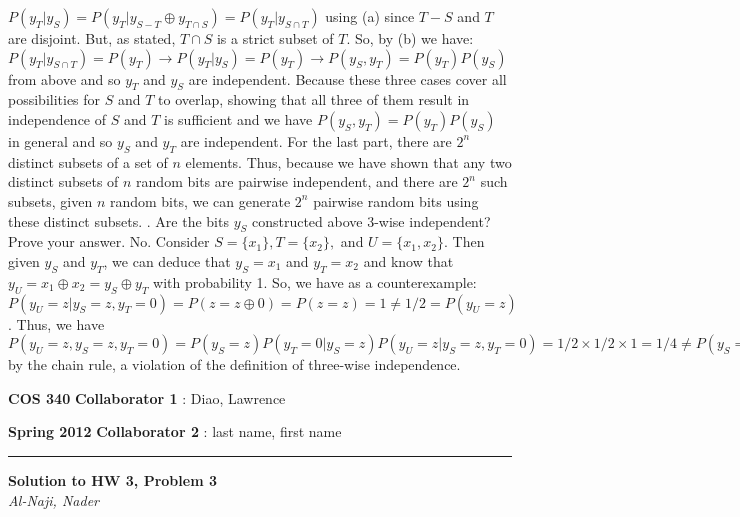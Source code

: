 \documentclass[12pt]{article}
\newcommand{\myheader}[4]
{\vspace*{-0.5in}
\noindent
{#1} \hfill {#3}

\noindent
{#2} \hfill {#4}

\noindent
\rule[8pt]{\textwidth}{1pt}

\vspace{1ex} 
}  %
\newcommand{\myalgsheader}[0]
{\myheader
{ {\bf{COS 340}} }
{ {\bf{Spring 2012}} }
{ {\bf{Collaborator 1}} : Diao, Lawrence }
{ {\bf{Collaborator 2}} : last name, first name}
}
\newcommand{\myhwtitle}[3]
{\begin{center}
{\large {\bf Solution to HW {#1}, Problem {#2}}}\\
\medskip 
{\it {#3}} %
\end{center}}
\begin{document}
$P(y_T | y_S) = P(y_T | y_{S-T} \oplus y_{T \cap S}) = P(y_T | y_{S \cap T})$ using (a) since $T-S$ and $T$ are disjoint.
\newline
But, as stated, $T \cap S$ is a strict subset of $T$. So, by (b) we have:
$P(y_T | y_{S \cap T}) = P(y_T) \rightarrow P(y_T | y_S) = P(y_T) \rightarrow P(y_S, y_T) = P(y_T)P(y_S)$ from above and so $y_T$ and $y_S$ are independent.
\newline
\newline
Because these three cases cover all possibilities for $S$ and $T$ to overlap, showing that all three of them result in independence
of $S$ and $T$ is sufficient and we have $P(y_S, y_T) = P(y_T)P(y_S)$ in general and so $y_S$ and $y_T$ are independent.
\newline
\newline
For the last part, there are $2^n$ distinct subsets of a set of $n$ elements. Thus, because we have shown that any two distinct 
subsets of $n$ random bits are pairwise independent, and there are $2^n$ such subsets, given $n$ random bits, we can generate $2^n$ pairwise 
random bits using these distinct subsets.
\newline
{}. Are the bits $y_S$ constructed above 3-wise independent? Prove your answer.
\newline
\newline
No. Consider $S = \{x_1\}, T = \{x_2\},$ and $U = \{x_1, x_2\}$. Then given $y_S$ and $y_T$, we can deduce that
$y_S = x_1$ and $y_T = x_2$ and know that $y_U = x_1 \oplus x_2 = y_S \oplus y_T$ with probability 1. So, we have
as a counterexample:
\newline
$P(y_U = z | y_S = z, y_T = 0) = P(z = z \oplus 0) = P(z = z) = 1 \not= 1/2 = P(y_U = z)$.
\newline
\newline
Thus, we have $P(y_U = z, y_S = z, y_T = 0) = P(y_S = z)P(y_T = 0| y_S=z)P(y_U=z | y_S=z, y_T=0) = 1/2\times 1/2 \times 1 = 1/4 
\neq P(y_S = z)P(y_T = 0)P(y_U = z) = 1/8$ by the chain rule, a violation of the definition of three-wise independence.



\pagebreak

\myalgsheader

\pagestyle{plain}

\myhwtitle{3}{3}{Al-Naji, Nader}

\bigskip
\end{document}
